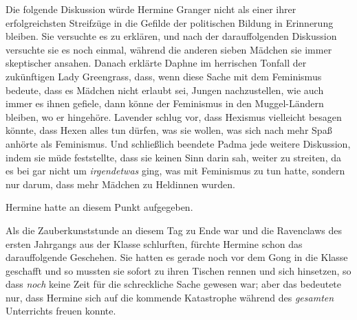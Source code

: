 Die folgende Diskussion würde Hermine Granger nicht als einer ihrer erfolgreichsten Streifzüge in die Gefilde der politischen Bildung in Erinnerung bleiben. Sie versuchte es zu erklären, und nach der darauffolgenden Diskussion versuchte sie es noch einmal, während die anderen sieben Mädchen sie immer skeptischer ansahen. Danach erklärte Daphne im herrischen Tonfall der zukünftigen Lady Greengrass, dass, wenn diese Sache mit dem Feminismus bedeute, dass es Mädchen nicht erlaubt sei, Jungen nachzustellen, wie auch immer es ihnen gefiele, dann könne der Feminismus in den Muggel-Ländern bleiben, wo er hingehöre. Lavender schlug vor, dass Hexismus vielleicht besagen könnte, dass Hexen alles tun dürfen, was sie wollen, was sich nach mehr Spaß anhörte als Feminismus. Und schließlich beendete Padma jede weitere Diskussion, indem sie müde feststellte, dass sie keinen Sinn darin sah, weiter zu streiten, da es bei \SPHEW gar nicht um \emph{irgendetwas} ging, was mit Feminismus zu tun hatte, sondern nur darum, dass mehr Mädchen zu Heldinnen wurden.

Hermine hatte an diesem Punkt aufgegeben.

\later

Als die Zauberkunststunde an diesem Tag zu Ende war und die Ravenclaws des ersten Jahrgangs aus der Klasse schlurften, fürchte Hermine schon das darauffolgende Geschehen. Sie hatten es gerade noch vor dem Gong in die Klasse geschafft und so mussten sie sofort zu ihren Tischen rennen und sich hinsetzen, so dass \emph{noch} keine Zeit für die schreckliche Sache gewesen war; aber das bedeutete nur, dass Hermine sich auf die kommende Katastrophe während des \emph{gesamten} Unterrichts freuen konnte.

